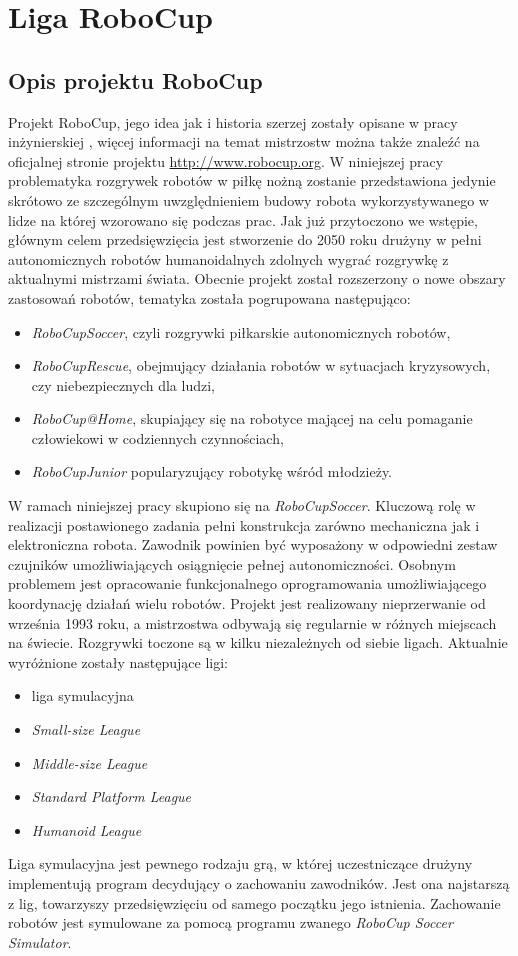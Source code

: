 \chapter{Liga RoboCup \label{chap:robocup}}
\section{Opis projektu RoboCup \label{sec:opis_robocup}}
	Projekt RoboCup, jego idea jak i historia szerzej zostały opisane w pracy inżynierskiej \cite{inzynierka}, więcej informacji na temat mistrzostw można także znaleźć na oficjalnej stronie projektu
	\mbox{\url{http://www.robocup.org}}. W niniejszej pracy problematyka rozgrywek robotów w piłkę nożną zostanie przedstawiona jedynie skrótowo ze szczególnym uwzględnieniem
	budowy robota wykorzystywanego w lidze na której wzorowano się podczas prac.
	Jak już przytoczono we wstępie, głównym celem przedsięwzięcia jest stworzenie do 2050 roku drużyny w pełni autonomicznych robotów humanoidalnych zdolnych wygrać rozgrywkę z aktualnymi mistrzami 
	świata. Obecnie projekt został rozszerzony o nowe obszary zastosowań robotów, tematyka została pogrupowana następująco:
	\begin{itemize}
	      \item \emph{RoboCupSoccer}, czyli rozgrywki piłkarskie autonomicznych robotów,
	      \item \emph{RoboCupRescue}, obejmujący działania robotów w sytuacjach kryzysowych, czy niebezpiecznych dla ludzi,
	      \item \emph{RoboCup@Home}, skupiający się na robotyce mającej na celu pomaganie człowiekowi w codziennych czynnościach,
	      \item \emph{RoboCupJunior} popularyzujący robotykę wśród młodzieży.
	\end{itemize}
	W ramach niniejszej pracy skupiono się na \emph{RoboCupSoccer}.
	Kluczową rolę w realizacji postawionego zadania pełni konstrukcja zarówno mechaniczna jak i elektroniczna
	robota. Zawodnik powinien być wyposażony w odpowiedni zestaw czujników umożliwiających osiągnięcie pełnej autonomiczności. 
	Osobnym problemem jest opracowanie funkcjonalnego oprogramowania umożliwiającego koordynację działań wielu robotów.
	Projekt jest realizowany nieprzerwanie od września 1993 roku, a mistrzostwa odbywają się regularnie w różnych miejscach na świecie.
	Rozgrywki toczone są w kilku niezależnych od siebie ligach. Aktualnie wyróżnione zostały następujące ligi:
	\begin{itemize}
	\item liga symulacyjna
	\item \emph{Small-size League}
	\item \emph{Middle-size League}
	\item \emph{Standard Platform League }
	\item \emph{Humanoid League}
	\end{itemize}
	Liga symulacyjna jest pewnego rodzaju grą, w której uczestniczące drużyny implementują program decydujący o zachowaniu zawodników.
	Jest ona najstarszą z lig, towarzyszy przedsięwzięciu od samego początku jego istnienia.
	Zachowanie robotów jest symulowane za pomocą programu zwanego \emph{RoboCup Soccer Simulator}.

